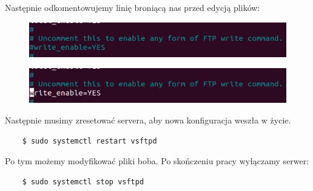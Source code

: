 \documentclass{article}
\begin{document}
Następnie odkomentowujemy linię broniącą nas przed edycją plików:
\begin{figure}[h!]
    \includegraphics[scale=1]{uncom.png}
    \centering
\end{figure}
\begin{figure}[h!]
    \includegraphics[scale=1]{nomlin.png}
    \centering
\end{figure}
Następnie musimy zresetować servera, aby nowa konfiguracja weszła w życie.
\begin{lstlisting}
    $ sudo systemctl restart vsftpd 
\end{lstlisting}
Po tym możemy modyfikować pliki boba.
Po skończeniu pracy wyłączamy serwer:
\begin{lstlisting}
    $ sudo systemctl stop vsftpd 
\end{lstlisting}
\end{document}
